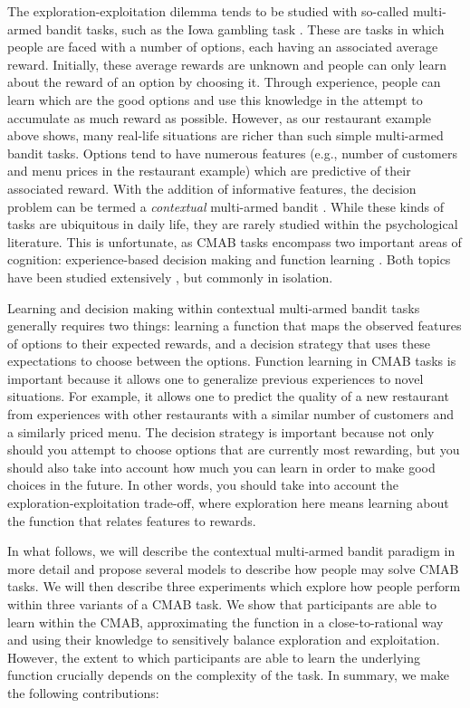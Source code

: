 \documentclass[a4paper,natbib]{apa6}
\begin{document}
The exploration-exploitation dilemma tends to be studied with so-called multi-armed bandit tasks, such as the Iowa gambling task \citep[e.g.,][]{bechara2005iowa, steyvers2009bayesian}. These are tasks in which people are faced with a number of options, each having an associated average reward. Initially, these average rewards are unknown and people can only learn about the reward of an option by choosing it. Through experience, people can learn which are the good options and use this knowledge in the attempt to accumulate as much reward as possible. However, as our restaurant example above shows, many real-life situations are richer than such simple multi-armed bandit tasks. Options tend to have numerous features (e.g., number of customers and menu prices in the restaurant example) which are predictive of their associated reward. With the addition of informative features, the decision problem can be termed a \emph{contextual} multi-armed bandit \citep[henceforth CMAB;][]{li2010contextual}. While these kinds of tasks are ubiquitous in daily life, they are rarely studied within the psychological literature. This is unfortunate, as CMAB tasks encompass two important areas of cognition: experience-based decision making \citep{barron2003small, hertwig2009description,speekenbrinkuncertainty} and function learning \citep{delosh1997extrapolation, kalish2004population,speekenbrink2010learning}. Both topics have been studied extensively \citep[see e.g.,][for an overview]{newell2015straight}, but commonly in isolation. 

Learning and decision making within contextual multi-armed bandit tasks generally requires two things: learning a function that maps the observed features of options to their expected rewards, and a decision strategy that uses these expectations to choose between the options. Function learning in CMAB tasks is important because it allows one to generalize previous experiences to novel situations. For example, it allows one to predict the quality of a new restaurant from experiences with other restaurants with a similar number of customers and a similarly priced menu. The decision strategy is important because not only should you attempt to choose options that are currently most rewarding, but you should also take into account how much you can learn in order to make good choices in the future. In other words, you should take into account the exploration-exploitation trade-off, where exploration here means learning about the function that relates features to rewards.

In what follows, we will describe the contextual multi-armed bandit paradigm in more detail and propose several models to describe how people may solve CMAB tasks. We will then describe three experiments which explore how people perform within three variants of a CMAB task. We show that participants are able to learn within the CMAB, approximating the function in a close-to-rational way \citep{srinivas2009gaussian, lucas2015rational} and using their knowledge to sensitively balance exploration and exploitation. However, the extent to which participants are able to learn the underlying function crucially depends on the complexity of the task.
%
In summary, we make the following contributions:
\end{document}
